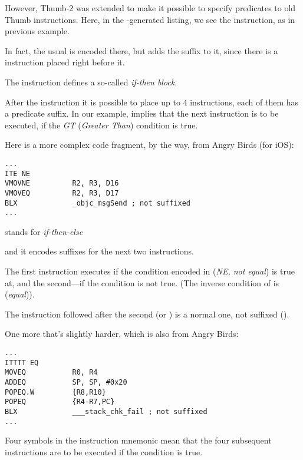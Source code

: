 
However, Thumb-2 was extended to make it possible to specify predicates to old Thumb instructions.
Here, in the \IDA-generated listing, we see the  instruction, as in previous example.

In fact, the usual  is encoded there, but \IDA adds the  suffix to it, 
since there is a  instruction placed right before it.

\label{ARM_Thumb_IT}
The  instruction defines a so-called \emph{if-then block}. 

After the instruction it is possible to place up to 4 instructions, 
each of them has a predicate suffix.
In our example,  implies that the next instruction is to be executed, if the \emph{GT} (\emph{Greater Than}) condition is true.

Here is a more complex code fragment, by the way, from Angry Birds (for iOS):

\begin{lstlisting}[caption=Angry Birds Classic,style=customasmARM]
...
ITE NE
VMOVNE          R2, R3, D16
VMOVEQ          R2, R3, D17
BLX             _objc_msgSend ; not suffixed
...
\end{lstlisting}

 stands for \emph{if-then-else} 

and it encodes suffixes for the next two instructions.

The first instruction executes if the condition encoded in  (\emph{NE, not equal}) is true at, and the second---if the condition is not true.
(The inverse condition of  is  (\emph{equal})).

The instruction followed after the second  (or ) is a normal one, not suffixed ().

One more that's slightly harder, which is also from Angry Birds:

\begin{lstlisting}[caption=Angry Birds Classic,style=customasmARM]
...
ITTTT EQ
MOVEQ           R0, R4
ADDEQ           SP, SP, #0x20
POPEQ.W         {R8,R10}
POPEQ           {R4-R7,PC}
BLX             ___stack_chk_fail ; not suffixed
...
\end{lstlisting}

Four  symbols in the instruction mnemonic mean that the four subsequent instructions are to be executed if the condition is true.


